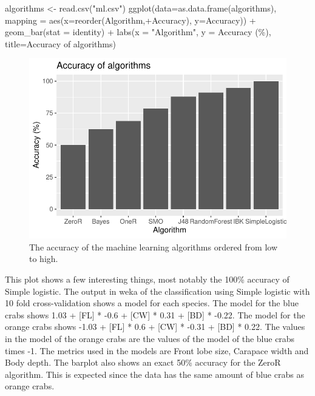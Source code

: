 \documentclass[
]{article}
\newenvironment{Shaded}{}{}
\newcommand{\AttributeTok}[1]{#1}
\newcommand{\FunctionTok}[1]{#1}
\newcommand{\NormalTok}[1]{#1}
\newcommand{\OtherTok}[1]{\textcolor[rgb]{1.00,0.25,0.00}{#1}}
\newcommand{\SpecialCharTok}[1]{\textcolor[rgb]{0.00,0.50,0.50}{#1}}
\newcommand{\StringTok}[1]{\textcolor[rgb]{0.00,0.50,0.50}{#1}}
\begin{document}
\begin{Shaded}
\begin{Highlighting}[]
\NormalTok{algorithms }\OtherTok{\textless{}{-}} \FunctionTok{read.csv}\NormalTok{(}\StringTok{"ml.csv"}\NormalTok{)}
\FunctionTok{ggplot}\NormalTok{(}\AttributeTok{data=}\FunctionTok{as.data.frame}\NormalTok{(algorithms), }\AttributeTok{mapping =} \FunctionTok{aes}\NormalTok{(}\AttributeTok{x=}\FunctionTok{reorder}\NormalTok{(Algorithm,}\SpecialCharTok{+}\NormalTok{Accuracy), }\AttributeTok{y=}\NormalTok{Accuracy)) }\SpecialCharTok{+}
  \FunctionTok{geom\_bar}\NormalTok{(}\AttributeTok{stat =} \StringTok{\textquotesingle{}identity\textquotesingle{}}\NormalTok{) }\SpecialCharTok{+}
  \FunctionTok{labs}\NormalTok{(}\AttributeTok{x =} \StringTok{"Algorithm"}\NormalTok{, }\AttributeTok{y =} \StringTok{\textquotesingle{}Accuracy (\%)\textquotesingle{}}\NormalTok{, }\AttributeTok{title=}\StringTok{\textquotesingle{}Accuracy of algorithms\textquotesingle{}}\NormalTok{)}
\end{Highlighting}
\end{Shaded}

\begin{figure}[H]

{\centering \includegraphics{Log_files/figure-latex/ml-1} 

}

\caption{The accuracy of the machine learning algorithms ordered from low to high.}\label{fig:ml}
\end{figure}

This plot shows a few interesting things, most notably the 100\%
accuracy of Simple logistic. The output in weka of the classification
using Simple logistic with 10 fold cross-validation shows a model for
each species. The model for the blue crabs shows 1.03 + {[}FL{]} * -0.6
+ {[}CW{]} * 0.31 + {[}BD{]} * -0.22. The model for the orange crabs
shows -1.03 + {[}FL{]} * 0.6 + {[}CW{]} * -0.31 + {[}BD{]} * 0.22. The
values in the model of the orange crabs are the values of the model of
the blue crabs times -1. The metrics used in the models are Front lobe
size, Carapace width and Body depth. The barplot also shows an exact
50\% accuracy for the ZeroR algorithm. This is expected since the data
has the same amount of blue crabs as orange crabs.
\end{document}
